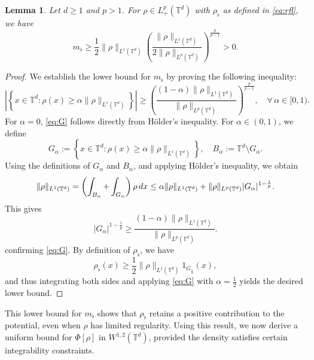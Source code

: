 \documentclass[11pt,reqno,a4paper]{amsart}
\newtheorem{lemma}{Lemma}[section]
\theoremstyle{definition}
\theoremstyle{remark}
\numberwithin{equation}{section}
\newcommand{\T} {\mathbb T}
\newcommand{\lt}{\left}
\newcommand{\rt}{\right}
\newcommand{\bq}{\begin{equation}}
\newcommand{\eq}{\end{equation}}
\newcommand{\dx}{\textnormal{d}x}
\begin{document}
\begin{lemma}\label{lem:mfl}
Let $d\ge 1$ and $p>1$. For $\rho \in L^p_+(\T^d)$ with $\rho_\flat$ as defined in \eqref{eq:rfl}, we have
\begin{equation}\label{eq:mfl}
m_\flat \ge \frac{1}{2}\|\rho\|_{L^1(\T^d)} \lt(\frac{\|\rho\|_{L^1(\T^d)}}{2\|\rho\|_{L^p(\T^d)}}\rt)^{\frac{p}{p-1}}>0.
\end{equation}
\end{lemma}
\begin{proof}
We establish the lower bound for $m_\flat$ by proving the following inequality:
\bq\label{eq:G}
\lt|\lt\{x \in \T^d : \rho(x) \ge \alpha \|\rho\|_{L^1(\T^d)}\rt\}\rt|  \ge \lt(\frac{(1-\alpha)\|\rho\|_{L^1(\T^d)}}{\|\rho\|_{L^p(\T^d)}}\rt)^{\frac{p}{p-1}},\quad \forall \,\alpha \in [0,1).
\eq
For $\alpha = 0$, \eqref{eq:G} follows directly from H\"older's inequality. For $\alpha \in (0,1)$, we define
\[%
G_\alpha:= \lt\{x\in\T^d: \rho(x) \ge \alpha \|\rho\|_{L^1(\T^d)} \rt\},\quad B_\alpha:=\T^d\setminus G_\alpha.
\]
Using the definitions of $G_\alpha$ and $B_\alpha$, and applying H\"older's inequality, we obtain
\begin{align*}
\begin{aligned}
\|\rho\|_{L^1(\T^d)} %
= \left(\int_{B_\alpha} + \int_{G_\alpha}\right) \rho\,\dx \le  \alpha \|\rho\|_{L^1(\T^d)} + \|\rho\|_{L^p(\T^d)} |G_\alpha|^{1-\frac{1}{p}}.
\end{aligned}
\end{align*}
This gives
\[
|G_\alpha|^{1-\frac{1}{p}} \ge \frac{(1-\alpha)\|\rho\|_{L^1(\T^d)}}{\|\rho\|_{L^p(\T^d)}}.
\]
confirming \eqref{eq:G}. By definition of $\rho_\flat$, we have
\[
\rho_\flat(x) \ge \frac{1}{2}\|\rho\|_{L^1(\T^d)}1_{G_{\frac{1}{2}}}(x),
\]
and thus integrating both sides and applying \eqref{eq:G} with $\alpha=\frac{1}{2}$ yields the desired lower bound.
\end{proof}

This lower bound for $m_\flat$ shows that $\rho_\flat$ retains a positive contribution to the potential, even when $\rho$ has limited regularity. Using this result, we now derive a uniform bound for $\Phi[\rho]$ in $W^{1,2}(\T^d)$, provided the density satisfies certain integrability constraints.
\end{document}
